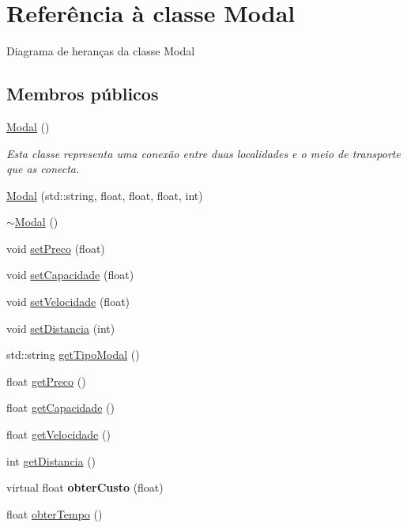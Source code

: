 \hypertarget{classModal}{}\section{Referência à classe Modal}
\label{classModal}


Diagrama de heranças da classe Modal
\subsection*{Membros públicos}
\begin{DoxyCompactItemize}
\item 
\hyperlink{classModal_a8762a8d9f09cb6a2ec5f54f5d26412c0}{Modal} ()
\begin{DoxyCompactList}\small\item\em Esta classe representa uma conexão entre duas localidades e o meio de transporte que as conecta. \end{DoxyCompactList}\item 
\hyperlink{classModal_a17560766811007d0af99fd6099325d52}{Modal} (std\+::string, float, float, float, int)
\item 
\hyperlink{classModal_a4a2e7830211c07075078b5d5186dab54}{$\sim$\+Modal} ()
\item 
void \hyperlink{classModal_ade6a106d1c7a0bc095ea1a012891ed00}{set\+Preco} (float)
\item 
void \hyperlink{classModal_affd03b3938af5cbe3541f82ae5ad8b6a}{set\+Capacidade} (float)
\item 
void \hyperlink{classModal_ac8da271cfb67468b89cbca0b3951b9f7}{set\+Velocidade} (float)
\item 
void \hyperlink{classModal_adae73e94a5d76a2a97329cba1fe7fb20}{set\+Distancia} (int)
\item 
std\+::string \hyperlink{classModal_ad0e185312cd36ad83b4e19fd1cd532be}{get\+Tipo\+Modal} ()
\item 
float \hyperlink{classModal_ae124094018f5e049d5137a8eec893a79}{get\+Preco} ()
\item 
float \hyperlink{classModal_ac9750361d92b6ad91674851852c7362f}{get\+Capacidade} ()
\item 
float \hyperlink{classModal_acac9a4b13c4596842253e25f84872b32}{get\+Velocidade} ()
\item 
int \hyperlink{classModal_a1eedb4dfdddd81a5a7c7b3203e50e68c}{get\+Distancia} ()
\item 
\mbox{\label{classModal_a20cee7247cce33806d681e1d60347cc5}} 
virtual float {\bfseries obter\+Custo} (float)
\item 
float \hyperlink{classModal_a71e2bda54694608c149ae0d72b3693a4}{obter\+Tempo} ()
\end{DoxyCompactItemize}
